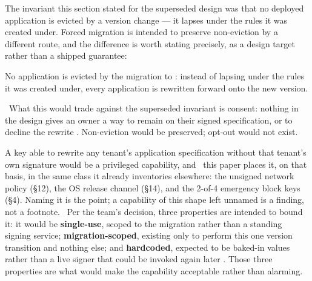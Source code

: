 The invariant this section stated for the superseded design was that no deployed application is
evicted by a version change — it lapses under the rules it was created under. Forced migration is
intended to preserve non-eviction by a different route, and the difference is worth stating
precisely, as a design target rather than a shipped guarantee:

\begin{property}
No application is evicted by the migration to : instead of lapsing under the rules it was
created under, every application is rewritten forward onto the new version.
\end{property}

\planned\ What this would trade against the superseded invariant is consent: nothing in the design
gives an owner a way to remain on their signed specification, or to decline the rewrite
. Non-eviction would be preserved; opt-out
would not exist.

A key able to rewrite any tenant's application specification without that tenant's own signature
would be a privileged capability, and \srcinferred\ this paper places it, on that basis, in the same
class it already inventories elsewhere: the unsigned network policy (\S12), the OS release channel
(\S14), and the 2-of-4 emergency block keys (\S4). Naming it is the point; a capability of this
shape left unnamed is a finding, not a footnote. \planned\ Per the team's decision, three properties
are intended to bound it: it would be \textbf{single-use}, scoped to the migration rather than a
standing signing service; \textbf{migration-scoped}, existing only to perform this one version
transition and nothing else; and \textbf{hardcoded}, expected to be baked-in values rather than a
live signer that could be invoked again later
. Those three properties are what would make the
capability acceptable rather than alarming.

